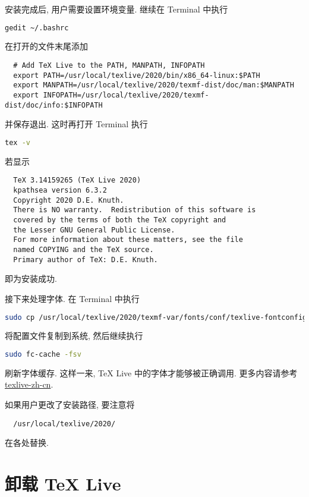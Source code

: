 安装完成后, 用户需要设置环境变量.
继续在 \textsf{Terminal} 中执行
\begin{lstlisting}[language = bash]
  gedit ~/.bashrc
\end{lstlisting}
在打开的文件末尾添加
\begin{lstlisting}
  # Add TeX Live to the PATH, MANPATH, INFOPATH
  export PATH=/usr/local/texlive/2020/bin/x86_64-linux:$PATH
  export MANPATH=/usr/local/texlive/2020/texmf-dist/doc/man:$MANPATH
  export INFOPATH=/usr/local/texlive/2020/texmf-dist/doc/info:$INFOPATH
\end{lstlisting}
并保存退出.
这时再打开 \textsf{Terminal} 执行
\begin{lstlisting}[language=bash]
  tex -v
\end{lstlisting}
若显示
\begin{lstlisting}
  TeX 3.14159265 (TeX Live 2020)
  kpathsea version 6.3.2
  Copyright 2020 D.E. Knuth.
  There is NO warranty.  Redistribution of this software is
  covered by the terms of both the TeX copyright and
  the Lesser GNU General Public License.
  For more information about these matters, see the file
  named COPYING and the TeX source.
  Primary author of TeX: D.E. Knuth.
\end{lstlisting}
即为安装成功.

接下来处理字体.
在 \textsf{Terminal} 中执行
\begin{lstlisting}[language=bash]
  sudo cp /usr/local/texlive/2020/texmf-var/fonts/conf/texlive-fontconfig.conf /etc/fonts/conf.d/09-texlive.conf
\end{lstlisting}
将配置文件复制到系统,
然后继续执行
\begin{lstlisting}[language=bash]
  sudo fc-cache -fsv
\end{lstlisting}
刷新字体缓存.
这样一来, \TeX{} Live 中的字体才能够被正确调用.
更多内容请参考 \href{https://www.tug.org/texlive/doc/texlive-zh-cn/texlive-zh-cn.pdf}{texlive-zh-cn}.

如果用户更改了安装路径,
要注意将
\begin{lstlisting}
  /usr/local/texlive/2020/
\end{lstlisting}
在各处替换.

\section{卸载 \TeX{} Live}\label{sec:ubuntu:uninstall}

